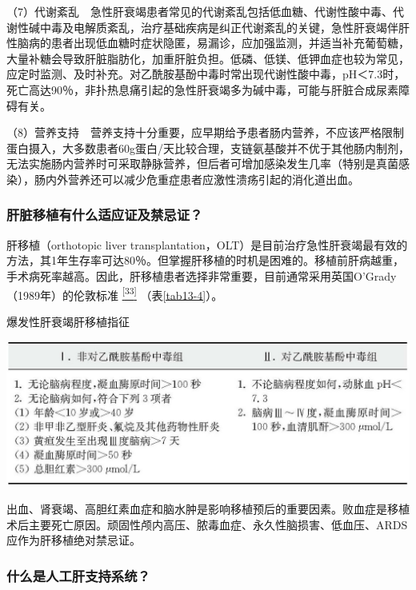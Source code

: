 （7）代谢紊乱　急性肝衰竭患者常见的代谢紊乱包括低血糖、代谢性酸中毒、代谢性碱中毒及电解质紊乱，治疗基础疾病是纠正代谢紊乱的关键，急性肝衰竭伴肝性脑病的患者出现低血糖时症状隐匿，易漏诊，应加强监测，并适当补充葡萄糖，大量补糖会导致肝脏脂肪化，加重肝脏负担。低磷、低镁、低钾血症也较为常见，应定时监测、及时补充。对乙酰胺基酚中毒时常出现代谢性酸中毒，pH＜7.3时，死亡高达90％，非扑热息痛引起的急性肝衰竭多为碱中毒，可能与肝脏合成尿素障碍有关。

（8）营养支持　营养支持十分重要，应早期给予患者肠内营养，不应该严格限制蛋白摄入，大多数患者60g蛋白/天比较合理，支链氨基酸并不优于其他肠内制剂，无法实施肠内营养时可采取静脉营养，但后者可增加感染发生几率（特别是真菌感染），肠内外营养还可以减少危重症患者应激性溃疡引起的消化道出血。

\subsubsection{肝脏移植有什么适应证及禁忌证？}

肝移植（orthotopic liver
transplantation，OLT）是目前治疗急性肝衰竭最有效的方法，其1年生存率可达80％。但掌握肝移植的时机是困难的。移植前肝病越重，手术病死率越高。因此，肝移植患者选择非常重要，目前通常采用英国O'Grady（1989年）的伦敦标准
\protect\hyperlink{text00019.htmlux5cux23ch33-18}{\textsuperscript{{[}33{]}}}
（表\ref{tab13-4}）。

\begin{table}[htbp]
\centering
\caption{爆发性肝衰竭肝移植指征}
\label{tab13-4}
\includegraphics{./images/Image00108.jpg}
\end{table}

出血、肾衰竭、高胆红素血症和脑水肿是影响移植预后的重要因素。败血症是移植术后主要死亡原因。顽固性颅内高压、脓毒血症、永久性脑损害、低血压、ARDS应作为肝移植绝对禁忌证。

\subsubsection{什么是人工肝支持系统？}

